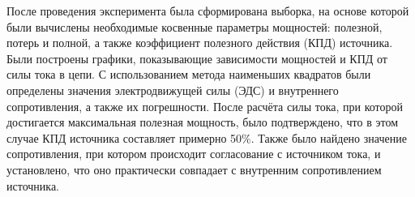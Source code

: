 После проведения эксперимента была сформирована выборка, на основе которой были вычислены необходимые косвенные параметры мощностей: полезной, потерь и полной, а также коэффициент полезного действия (КПД) источника. Были построены графики, показывающие зависимости мощностей и КПД от силы тока в цепи. С использованием метода наименьших квадратов были определены значения электродвижущей силы (ЭДС) и внутреннего сопротивления, а также их погрешности. После расчёта силы тока, при которой достигается максимальная полезная мощность, было подтверждено, что в этом случае КПД источника составляет примерно 50\%. Также было найдено значение сопротивления, при котором происходит согласование с источником тока, и установлено, что оно практически совпадает с внутренним сопротивлением источника.